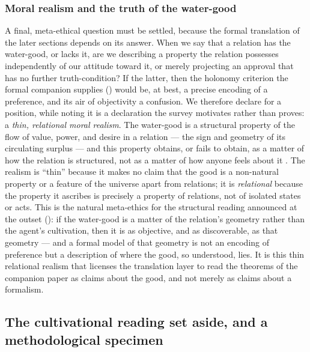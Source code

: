 \subsubsection{Moral realism and the truth of the water-good}
\label{p20:ssub:review-metaethics}

A final, meta-ethical question must be settled, because the formal translation of the later sections depends on its answer. When we say that a relation has the water-good, or lacks it, are we describing a property the relation possesses independently of our attitude toward it, or merely projecting an approval that has no further truth-condition? If the latter, then the holonomy criterion the formal companion supplies () would be, at best, a precise encoding of a preference, and its air of objectivity a confusion. We therefore declare for a position, while noting it is a declaration the survey motivates rather than proves: a \emph{thin, relational moral realism}. The water-good is a structural property of the flow of value, power, and desire in a relation --- the sign and geometry of its circulating surplus --- and this property obtains, or fails to obtain, as a matter of how the relation is structured, not as a matter of how anyone feels about it \parencite{railton1986}. The realism is ``thin'' because it makes no claim that the good is a non-natural property or a feature of the universe apart from relations; it is \emph{relational} because the property it ascribes is precisely a property of relations, not of isolated states or acts. This is the natural meta-ethics for the structural reading announced at the outset (): if the water-good is a matter of the relation's geometry rather than the agent's cultivation, then it is as objective, and as discoverable, as that geometry --- and a formal model of that geometry is not an encoding of preference but a description of where the good, so understood, lies. It is this thin relational realism that licenses the translation layer to read the theorems of the companion paper as claims about the good, and not merely as claims about a formalism.


\subsection{The cultivational reading set aside, and a methodological specimen}
\label{p20:sub:review-cultivation}

